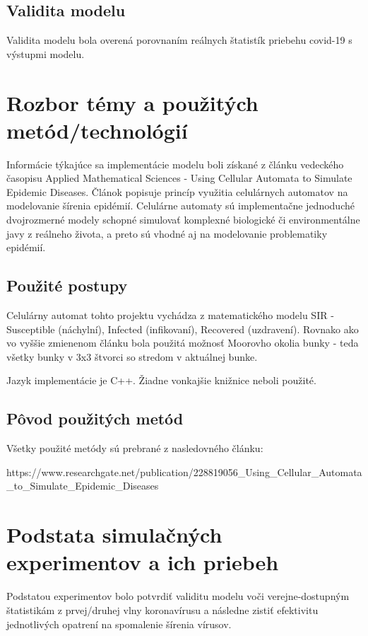 \documentclass[11pt,a4paper,titlepage]{article}
\begin{document}
\subsection{Validita modelu}
Validita modelu bola overená porovnaním reálnych štatistík priebehu covid-19 s výstupmi modelu. 

\section{Rozbor témy a použitých metód/technológií}
Informácie týkajúce sa implementácie modelu boli získané z článku vedeckého časopisu Applied Mathematical Sciences - Using Cellular Automata to Simulate Epidemic Diseases.\cite{Zdroj}
Článok popisuje princíp využitia celulárnych automatov na modelovanie šírenia epidémií. Celulárne automaty sú implementačne jednoduché dvojrozmerné modely schopné simulovať komplexné biologické či environmentálne javy z reálneho života, a preto sú vhodné aj na modelovanie problematiky epidémií.

\subsection{Použité postupy}
Celulárny automat tohto projektu vychádza z matematického modelu SIR - Susceptible (náchylní), Infected (infikovaní), Recovered (uzdravení). Rovnako ako vo vyššie zmienenom článku bola použitá možnosť Moorovho okolia bunky - teda všetky bunky v 3x3 štvorci so stredom v aktuálnej bunke.

\noindent Jazyk implementácie je C++. Žiadne vonkajšie knižnice neboli použité.

\subsection{Pôvod použitých metód}
Všetky použité metódy sú prebrané z nasledovného článku:

\noindent https://www.researchgate.net/publication/228819056\_Using\_Cellular\_Automata\_to\_Simulate\_Epidemic\_Diseases

\section{Podstata simulačných experimentov a ich priebeh}
Podstatou experimentov bolo potvrdiť validitu modelu voči verejne-dostupným štatistikám z prvej/druhej vlny koronavírusu a následne zistiť efektivitu jednotlivých opatrení na spomalenie šírenia vírusov.
\end{document}

